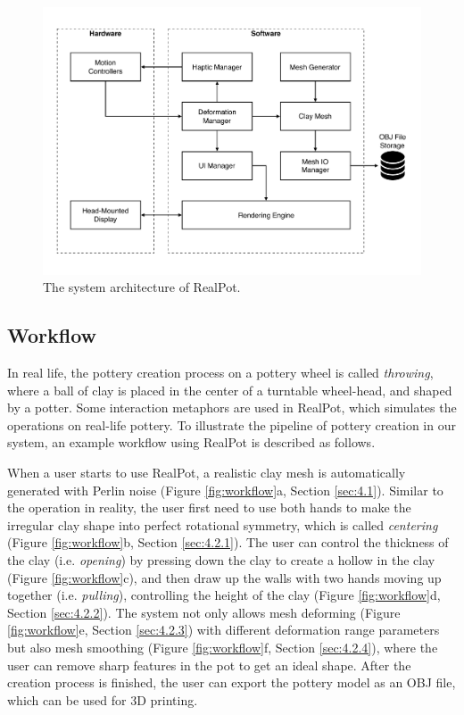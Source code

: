 \documentclass{svjour3}                     %
\begin{document}
\begin{figure}
\includegraphics[width=\textwidth]{fig2}
\caption{The system architecture of RealPot.}
\label{fig:arc}
\end{figure}



\subsection{Workflow}
\label{sec:3.2}
In real life, the pottery creation process on a pottery wheel is called \textit{throwing}, where a ball of clay is placed in the center of a turntable wheel-head, and shaped by a potter.
Some interaction metaphors are used in RealPot, which simulates the operations on real-life pottery.
To illustrate the pipeline of pottery creation in our system, an example workflow using RealPot is described as follows.

When a user starts to use RealPot, a realistic clay mesh is automatically generated with Perlin noise (Figure \ref{fig:workflow}a, Section \ref{sec:4.1}). 
Similar to the operation in reality, the user first need to use both hands to make the irregular clay shape into perfect rotational symmetry, which is called \textit{centering} (Figure \ref{fig:workflow}b, Section \ref{sec:4.2.1}).
The user can control the thickness of the clay (i.e. \textit{opening}) by pressing down the clay to create a hollow in the clay (Figure \ref{fig:workflow}c), 
and then draw up the walls with two hands moving up together (i.e. \textit{pulling}), controlling the height of the clay (Figure \ref{fig:workflow}d, Section \ref{sec:4.2.2}).
The system not only allows mesh deforming (Figure \ref{fig:workflow}e, Section \ref{sec:4.2.3}) with different deformation range parameters but also mesh smoothing (Figure \ref{fig:workflow}f, Section \ref{sec:4.2.4}), where the user can remove sharp features in the pot to get an ideal shape.
After the creation process is finished, the user can export the pottery model as an OBJ file, which can be used for 3D printing.
\end{document}
